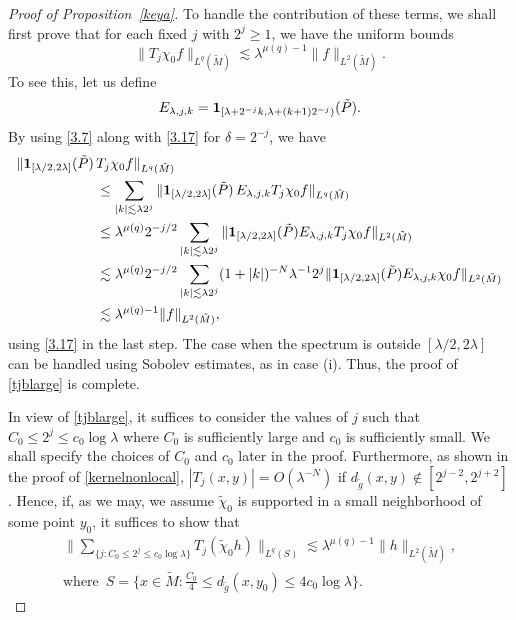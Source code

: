 \documentclass[10pt]{amsart}
\newcommand{\la}{\lambda}
\newcommand{\one}{{\bf 1}}
\newcommand{\1}{{\bf 1}}
\begin{document}
\begin{proof}[Proof of Proposition~\ref{keya}]
To handle the contribution of these terms, we shall first prove that for each fixed $j$ with $2^j\ge1$, we have the uniform bounds
\begin{equation}\label{tjblarge}
   \| T_j\chi_0 f\|_{L^{q}(\tilde M)} \lesssim \la^{\mu(q)-1}  \|f\|_{L^2(\tilde M)}.
\end{equation}
To see this, let us define
\begin{equation}\label{ej}
    E_{\la,j,k}=\one_{[\la+2^{-j}k, \la +(k+1)2^{-j})}( \tilde P).
 \end{equation} 
 By using \eqref{3.7} along with \eqref{3.17}  for $\delta=2^{-j}$,
we have 
\begin{align*}
\|\one_{[\la/2,2\la]}( \tilde P) \, & T_j\chi_0 f\|_{L^{q}(\tilde M)}
\\
&\le \sum_{|k|\lesssim \la 2^{j}}
\|\one_{[\la/2,2\la]}( \tilde P) \, E_{\la,j,k} T_j\chi_0 f\|_{L^{q}(\tilde M)}
\\
&\le  \la^{\mu(q)}2^{-j/2}  \sum_{|k|\lesssim \la2^j}
\|\one_{[\la/2,2\la]}( \tilde P) E_{\la,j,k} T_j\chi_0 f\|_{L^2( \tilde M)}
\\
&\lesssim \la^{\mu(q)}2^{-j/2}\sum_{|k|\lesssim \la2^j} (1+|k|)^{-N} \la^{-1}2^j  \|\one_{[\la/2,2\la]}( \tilde P) E_{\la,j,k} \chi_0f\|_{L^2(\tilde M)}
\\
&\lesssim \la^{\mu(q)-1}  \|f\|_{L^2(\tilde M)},
\end{align*}
using \eqref{3.17} in the last step.
The case when the spectrum is outside $[\la/2,2\la]$ can be handled using Sobolev estimates, as in case (i). Thus, the proof of \eqref{tjblarge} is complete.


In view of \eqref{tjblarge}, it suffices to consider the values of  $j$ such that $C_0\le 2^j\le c_0\log\la$ where $C_0$ is sufficiently large and $c_0$ is sufficiently small. We shall specify the choices of $C_0$ and $c_0$ later in the proof. Furthermore, as shown in the proof of \eqref{kernelnonlocal}, $|T_j(x,y)|=O(\la^{-N})$ if $d_{\tilde g}(x,y)\notin [2^{j-2}, 2^{j+2}]$. Hence, if, as we may, 
we assume $\tilde \chi_0$ is supported in a small neighborhood of some point $y_0$, it suffices to show that 
\begin{multline}\label{n2}
\|\sum_{\{j:C_0\le 2^j\le c_0\log\la\}} T_j(\tilde \chi_0 h)\|_{L^q(S)}\lesssim 
    \la^{\mu(q)-1}\|h\|_{L^2(\tilde M)},
    \\
    \text{where }  \, S=\{x\in \tilde M: \frac {C_0}{4}\le d_{\tilde g}(x,y_0)\le 4c_0\log\la\}.
\end{multline}



\end{proof}
\end{document}
